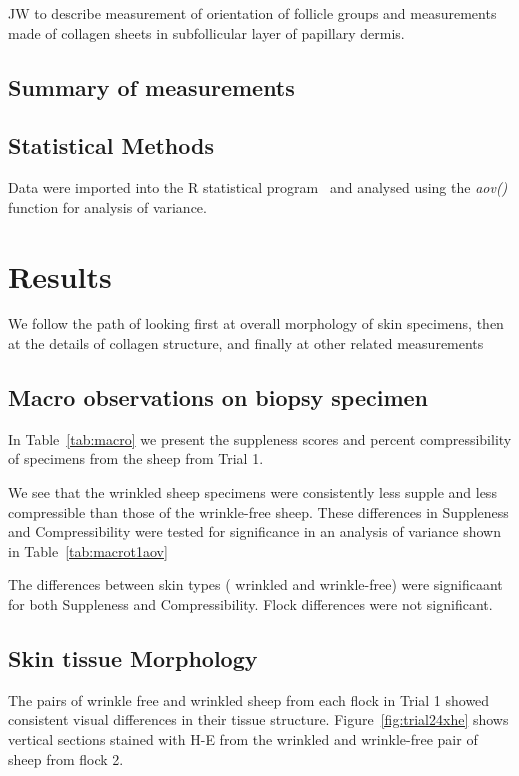 \documentclass[titlepage]{article}  %
\begin{document}
JW to describe measurement of orientation of follicle groups
and measurements made of collagen sheets in subfollicular layer of
papillary dermis.


\subsection{Summary of measurements}


\subsection{Statistical Methods}

Data were imported into the R statistical program~\cite{rprog:13} and analysed using the {\em aov()} function for analysis of variance.

\section{Results}
We follow the path of looking first at overall morphology of skin specimens, then at the details of collagen structure, and finally at other related measurements

\subsection{Macro observations on biopsy specimen}
In Table~\ref{tab:macro} we present the suppleness scores and percent compressibility of specimens from the sheep from Trial 1.

We see that the wrinkled sheep specimens were consistently less supple and less compressible than those of the wrinkle-free sheep.
These differences in Suppleness and Compressibility were tested for significance in an analysis of variance shown in Table~\ref{tab:macrot1aov}

The differences between skin types ( wrinkled and wrinkle-free) were significaant for both Suppleness and Compressibility. Flock differences were not significant.

\subsection{Skin tissue Morphology}
The pairs of wrinkle free and wrinkled sheep from each flock in Trial 1 showed consistent visual differences in their tissue structure. Figure~\ref{fig:trial24xhe} shows vertical sections stained with H-E from the wrinkled and wrinkle-free pair of sheep from flock 2.


\end{document}
